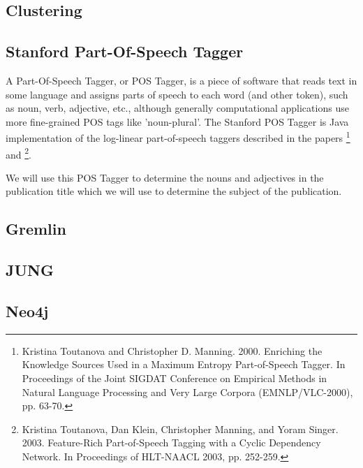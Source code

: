 \subsection{Clustering}

\subsection{Stanford Part-Of-Speech Tagger}

A Part-Of-Speech Tagger, or POS Tagger, is a piece of software that reads text in some language and assigns parts of speech to each word (and other token), such as noun, verb, adjective, etc., although generally computational applications use more fine-grained POS tags like 'noun-plural'. The Stanford POS Tagger is Java implementation of the log-linear part-of-speech taggers described in the papers \footnote{Kristina Toutanova and Christopher D. Manning. 2000. Enriching the Knowledge Sources Used in a Maximum Entropy Part-of-Speech Tagger. In Proceedings of the Joint SIGDAT Conference on Empirical Methods in Natural Language Processing and Very Large Corpora (EMNLP/VLC-2000), pp. 63-70.} and \footnote{Kristina Toutanova, Dan Klein, Christopher Manning, and Yoram Singer. 2003. Feature-Rich Part-of-Speech Tagging with a Cyclic Dependency Network. In Proceedings of HLT-NAACL 2003, pp. 252-259.}.

We will use this POS Tagger to determine the nouns and adjectives in the publication title which we will use to determine the subject of the publication.

\subsection{Gremlin}

\subsection{JUNG}

\subsection{Neo4j}